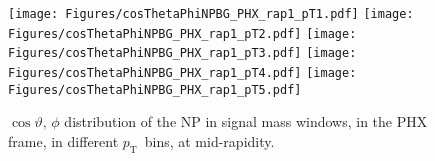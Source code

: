 \documentclass[12pt]{article}
\newcommand{\pt}{$p_{\mathrm{T}}$}
\begin{document}
%
%


\begin{figure}[htbp]
\centering
\texttt{[image: Figures/cosThetaPhiNPBG\_PHX\_rap1\_pT1.pdf]}
\texttt{[image: Figures/cosThetaPhiNPBG\_PHX\_rap1\_pT2.pdf]}
\texttt{[image: Figures/cosThetaPhiNPBG\_PHX\_rap1\_pT3.pdf]}
\texttt{[image: Figures/cosThetaPhiNPBG\_PHX\_rap1\_pT4.pdf]}
\texttt{[image: Figures/cosThetaPhiNPBG\_PHX\_rap1\_pT5.pdf]}
\caption{$\cos\vartheta,\,\phi$ distribution of the NP in signal mass windows, 
	in the PHX frame, in different \pt\ bins, at mid-rapidity.}
\end{figure}
\clearpage
\end{document}
